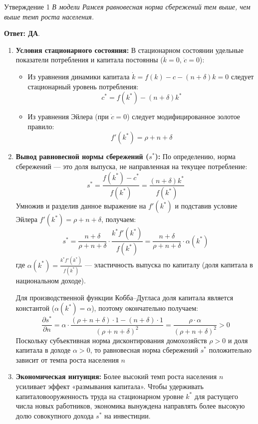 \documentclass[10pt,a4paper]{article}
\newcommand{\qda}{\textbf{\color{yesgreen}Ответ: ДА}}
\newenvironment{answer}[2]{%
  \begin{qbox}{Утверждение #1}
  \textit{#2}\par\smallskip
}{%
  \end{qbox}\vspace{2pt}
}
\begin{document}
\begin{answer}{1}{В модели Рамсея равновесная норма сбережений тем выше, чем выше темп роста населения.}
\qda. \begin{enumerate}
    \item \textbf{Условия стационарного состояния:}
    В стационарном состоянии удельные показатели потребления и капитала постоянны ($\dot{k} = 0$, $\dot{c} = 0$):
    \begin{itemize}
        \item Из уравнения динамики капитала $\dot{k} = f(k) - c - (n + \delta)k = 0$ следует стационарный уровень потребления:
        \[
        c^* = f(k^*) - (n + \delta)k^*
        \]
        \item Из уравнения Эйлера (при $\dot{c} = 0$) следует модифицированное золотое правило:
        \[
        f'(k^*) = \rho + n + \delta
        \]
    \end{itemize}

    \item \textbf{Вывод равновесной нормы сбережений ($s^*$):}
    По определению, норма сбережений — это доля выпуска, не направленная на текущее потребление:
    \[
    s^* = \frac{f(k^*) - c^*}{f(k^*)} = \frac{(n + \delta)k^*}{f(k^*)}
    \]
    Умножив и разделив данное выражение на $f'(k^*)$ и подставив условие Эйлера $f'(k^*) = \rho + n + \delta$, получаем:
    \[
    s^* = \frac{n + \delta}{\rho + n + \delta} \cdot \frac{k^* f'(k^*)}{f(k^*)} = \frac{n + \delta}{\rho + n + \delta} \cdot \alpha(k^*)
    \]
    где $\alpha(k^*) = \frac{k^* f'(k^*)}{f(k^*)}$ — эластичность выпуска по капиталу (доля капитала в национальном доходе).

    Для производственной функции Кобба–Дугласа доля капитала является константой ($\alpha(k^*) = \alpha$), поэтому окончательно получаем:
    \[
    \frac{\partial s^*}{\partial n} = \alpha \cdot \frac{(\rho + n + \delta)\cdot 1 - (n + \delta)\cdot 1}{(\rho + n + \delta)^2} = \frac{\rho \cdot \alpha}{(\rho + n + \delta)^2} > 0
    \]
    Поскольку субъективная норма дисконтирования домохозяйств $\rho > 0$ и доля капитала в доходе $\alpha > 0$, то равновесная норма сбережений $s^*$ положительно зависит от темпа роста населения $n$

    \item \textbf{Экономическая интуиция:}
    Более высокий темп роста населения $n$ усиливает эффект «размывания капитала». Чтобы удерживать капиталовооруженность труда на стационарном уровне $k^*$ для растущего числа новых работников, экономика вынуждена направлять более высокую долю совокупного дохода $s^*$ на инвестиции.
\end{enumerate}
\end{answer}
\end{document}
